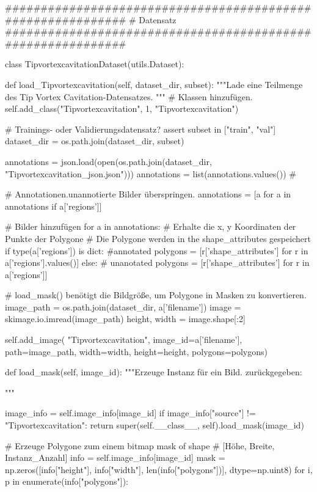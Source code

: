     
############################################################
#  Datensatz
############################################################

class TipvortexcavitationDataset(utils.Dataset):

    def load_Tipvortexcavitation(self, dataset_dir, subset):
        """Lade eine Teilmenge des Tip Vortex Cavitation-Datensatzes.
        """
        # Klassen hinzufügen.  
        self.add_class("Tipvortexcavitation", 1, "Tipvortexcavitation")

        # Trainings- oder Validierungsdatensatz?
        assert subset in ["train", "val"]
        dataset_dir = os.path.join(dataset_dir, subset)

       
        annotations = json.load(open(os.path.join(dataset_dir, "Tipvortexcavitation_json.json")))
        annotations = list(annotations.values())  # 

        
        # Annotationen.unannotierte Bilder überspringen.
        annotations = [a for a in annotations if a['regions']]

        # Bilder hinzufügen
        for a in annotations:
            # Erhalte die x, y Koordinaten der Punkte der Polygone
            # Die Polygone werden in the shape_attributes gespeichert
            if type(a['regions']) is dict: #annotated
                polygons = [r['shape_attributes'] for r in a['regions'].values()]
            else: # unanotated
                polygons = [r['shape_attributes'] for r in a['regions']] 

            # load_mask() benötigt die Bildgröße, um Polygone in Masken zu konvertieren.
            image_path = os.path.join(dataset_dir, a['filename'])
            image = skimage.io.imread(image_path)
            height, width = image.shape[:2]

            self.add_image(
                "Tipvortexcavitation",
                image_id=a['filename'],  
                path=image_path,
                width=width, height=height,
                polygons=polygons)

    def load_mask(self, image_id):
        """Erzeuge Instanz  für ein Bild.
       zurückgegeben:
        
        """
        
        image_info = self.image_info[image_id]
        if image_info["source"] != "Tipvortexcavitation":
            return super(self.__class__, self).load_mask(image_id)

        # Erzeuge Polygone zum einem bitmap mask of shape
        # [Höhe, Breite, Instanz_Anzahl]
        info = self.image_info[image_id]
        mask = np.zeros([info["height"], info["width"], len(info["polygons"])],
                        dtype=np.uint8)
        for i, p in enumerate(info["polygons"]):
            
